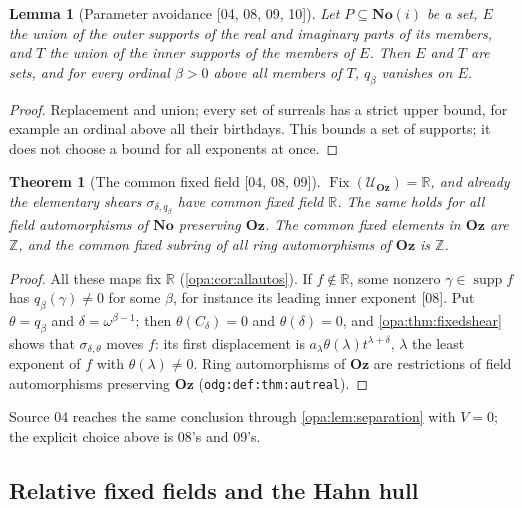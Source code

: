 \documentclass[11pt,oneside]{article}
\numberwithin{equation}{section}
\newtheorem{theorem}{Theorem}[section]
\newtheorem{lemma}[lemma]{Lemma}
\theoremstyle{definition}
\theoremstyle{remark}
\newcommand{\No}{\mathbf{No}}
\newcommand{\Oz}{\mathbf{Oz}}
\newcommand{\SC}{\mathbf{No}(i)}
\newcommand{\R}{\mathbb R}
\newcommand{\Z}{\mathbb Z}
\newcommand{\UU}{\mathcal U}
\newcommand{\supp}{\operatorname{supp}}
\newcommand{\Fix}{\operatorname{Fix}}
\newcommand{\src}[1]{\textup{\textsf{\small[#1]}}}
\newcommand{\lbl}[1]{\nolinkurl{#1}}
\begin{document}
\begin{lemma}[Parameter avoidance \src{04, 08, 09, 10}]\label{opa:lem:avoid}
Let $P\subseteq\SC$ be a set, $E$ the union of the outer supports of the real and
imaginary parts of its members, and $T$ the union of the inner supports of the
members of $E$. Then $E$ and $T$ are sets, and for every ordinal $\beta>0$ above
all members of $T$, $q_\beta$ vanishes on $E$.
\end{lemma}
\begin{proof}
Replacement and union; every set of surreals has a strict upper bound, for
example an ordinal above all their birthdays. This bounds a set of supports; it
does not choose a bound for all exponents at once.
\end{proof}

\begin{theorem}[The common fixed field \src{04, 08, 09}]\label{opa:thm:fixed}
$\Fix(\UU_\Oz)=\R$, and already the elementary shears $\sigma_{\delta,q_\beta}$ have
common fixed field $\R$. The same holds for all field automorphisms of $\No$
preserving $\Oz$. The common fixed elements in $\Oz$ are $\Z$, and the common
fixed subring of all ring automorphisms of $\Oz$ is $\Z$.
\end{theorem}
\begin{proof}
All these maps fix $\R$ (\cref{opa:cor:allautos}). If $f\notin\R$, some nonzero
$\gamma\in\supp f$ has $q_\beta(\gamma)\ne0$ for some $\beta$, for instance its leading
inner exponent \src{08}. Put $\theta=q_\beta$ and $\delta=\omega^{\beta-1}$; then
$\theta(C_\delta)=0$ and $\theta(\delta)=0$, and \cref{opa:thm:fixedshear} shows that
$\sigma_{\delta,\theta}$ moves $f$: its first displacement is
$a_\lambda\theta(\lambda)t^{\lambda+\delta}$, $\lambda$ the least exponent of $f$ with
$\theta(\lambda)\ne0$. Ring automorphisms of $\Oz$ are restrictions of field
automorphisms preserving $\Oz$ (\lbl{odg:def:thm:autreal}).
\end{proof}

Source 04 reaches the same conclusion through \cref{opa:lem:separation} with
$V=0$; the explicit choice above is 08's and 09's.

\subsection{Relative fixed fields and the Hahn hull}
\end{document}

